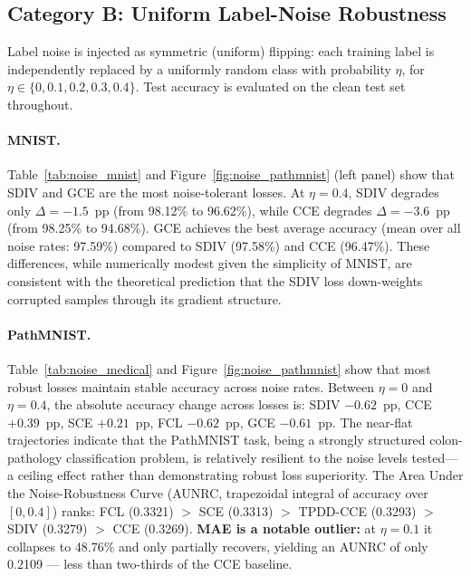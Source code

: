 \subsection{Category B: Uniform Label-Noise Robustness}
\label{sec:noise}

Label noise is injected as symmetric (uniform) flipping: each training label
is independently replaced by a uniformly random class with probability $\eta$,
for $\eta \in \{0, 0.1, 0.2, 0.3, 0.4\}$.
Test accuracy is evaluated on the clean test set throughout.

\paragraph{MNIST.}
Table~\ref{tab:noise_mnist} and Figure~\ref{fig:noise_pathmnist} (left panel)
show that SDIV and GCE are the most noise-tolerant losses.
At $\eta{=}0.4$, SDIV degrades only $\Delta{=}{-1.5}$~pp (from 98.12\% to
96.62\%), while CCE degrades $\Delta{=}{-3.6}$~pp (from 98.25\% to 94.68\%).
GCE achieves the best average accuracy (mean over all noise rates: 97.59\%)
compared to SDIV (97.58\%) and CCE (96.47\%).
These differences, while numerically modest given the simplicity of MNIST,
are consistent with the theoretical prediction that the SDIV loss
down-weights corrupted samples through its gradient structure.

\paragraph{PathMNIST.}
Table~\ref{tab:noise_medical} and Figure~\ref{fig:noise_pathmnist} show that
most robust losses maintain stable accuracy across noise rates.
Between $\eta{=}0$ and $\eta{=}0.4$, the absolute accuracy change across
losses is:
SDIV $-0.62$~pp, CCE $+0.39$~pp,
SCE $+0.21$~pp, FCL $-0.62$~pp, GCE $-0.61$~pp.
The near-flat trajectories indicate that the PathMNIST task, being a strongly
structured colon-pathology classification problem, is relatively resilient to
the noise levels tested---a ceiling effect rather than demonstrating robust
loss superiority.
The Area Under the Noise-Robustness Curve (AUNRC, trapezoidal integral of
accuracy over $[0, 0.4]$) ranks:
FCL (0.3321) $>$ SCE (0.3313) $>$ TPDD-CCE (0.3293) $>$ SDIV (0.3279) $>$ CCE (0.3269).
\textbf{MAE is a notable outlier:} at $\eta{=}0.1$ it collapses to 48.76\%
and only partially recovers, yielding an AUNRC of only 0.2109 ---
less than two-thirds of the CCE baseline.

